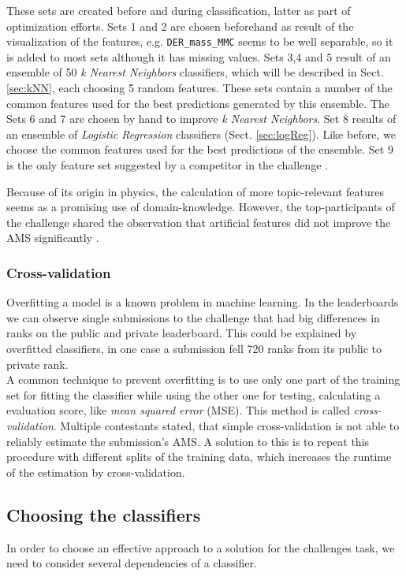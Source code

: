 These sets are created before and during classification, latter as part of optimization efforts. Sets 1 and 2 are chosen beforehand as result of the visualization of the features, e.g. \texttt{DER\_mass\_MMC} seems to be well separable, so it is added to most sets although it has missing values. Sets 3,4 and 5 result of an ensemble of 50 \emph{k Nearest Neighbors} classifiers, which will be described in Sect. \ref{sec:kNN}, each choosing 5 random features. These sets contain a number of the common features used for the best predictions generated by this ensemble. The Sets 6 and 7 are chosen by hand to improve \emph{k Nearest Neighbors}. Set 8 results of an ensemble of \emph{Logistic Regression} classifiers (Sect. \ref{sec:logReg}). Like before, we choose the common features used for the best predictions of the ensemble. Set 9 is the only feature set suggested by a competitor in the challenge \cite{blog}.

Because of its origin in physics, the calculation of more topic-relevant features seems as a promising use of domain-knowledge. However, the top-participants of the challenge shared the observation that artificial features did not improve the AMS significantly \cite{melis-1st,salimans-2nd,courtiol-3rd}.

\subsubsection{Cross-validation}
Overfitting a model is a known problem in machine learning. In the leaderboards we can observe single submissions to the challenge that had big differences in ranks on the public and private leaderboard. This could be explained by overfitted classifiers, in one case a submission fell 720 ranks from its public to private rank. \\
A common technique to prevent overfitting is to use only one part of the training set for fitting the classifier while using the other one for testing, calculating a evaluation score, like \emph{mean squared error} (MSE). This method is called \emph{cross-validation}.  Multiple contestants stated, that simple cross-validation is not able to reliably estimate the submission's AMS. A solution to this is to repeat this procedure with different splits of the training data, which increases the runtime of the estimation by cross-validation.

\subsection{Choosing the classifiers}\label{sec:choice}
In order to choose an effective approach to a solution for the challenges task, we need to consider several dependencies of a classifier.

